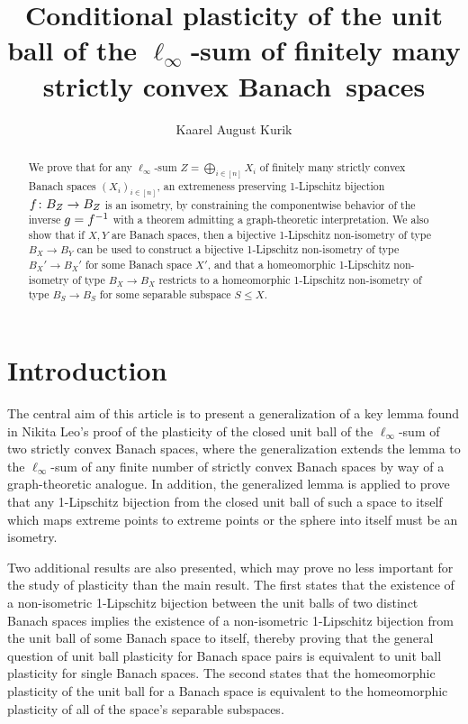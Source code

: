 \documentclass{amsart}
\title[Conditional plasticity]{Conditional plasticity of the unit ball of the \(\ell_\infty\)‑sum of finitely many strictly convex Banach~spaces}
\author{Kaarel August Kurik}
\date{}
\theoremstyle{definition}
\begin{document}
\begin{abstract}
    We prove that for any $\ell_\infty$-sum $Z = \bigoplus_{i \in [n]} X_i$ of finitely many strictly
    convex Banach spaces $(X_i)_{i \in [n]}$, an extremeness preserving 1-Lipschitz bijection
    $f\colon B_Z \to B_Z$ is an isometry, by constraining the componentwise behavior of the inverse
    $g=f^{-1}$ with a theorem admitting a graph-theoretic interpretation.
    We also show that if $X, Y$ are Banach spaces, then a bijective 1-Lipschitz non-isometry of
    type $B_X \to B_Y$ can be used to construct a bijective 1-Lipschitz non-isometry of type
    $B_X' \to B_X'$ for some Banach space $X'$, and that a homeomorphic 1-Lipschitz non-isometry of
    type $B_X \to B_X$ restricts to a homeomorphic 1-Lipschitz non-isometry of type
    $B_S \to B_S$ for some separable subspace $S \leq X$.
\end{abstract}

\maketitle

\section{Introduction}

The central aim of this article is to present a generalization of a key lemma
found in Nikita Leo's proof of the plasticity of the closed unit ball of
the $\ell_\infty$-sum of two strictly convex Banach spaces, where the generalization
extends the lemma to the $\ell_\infty$-sum of any finite number of strictly convex Banach
spaces by way of a graph-theoretic analogue. In addition, the generalized lemma is applied to prove that any 1-Lipschitz bijection from
the closed unit ball of such a space to itself
which maps extreme points to extreme points
or the sphere into itself must be an isometry.

Two additional results are also presented, which may prove no less important for the study of plasticity than the main result. The first states that the existence of a non-isometric 1-Lipschitz bijection between the unit balls of two distinct Banach spaces implies the existence of a non-isometric 1-Lipschitz bijection from the unit ball of some Banach space to itself, thereby proving that the general question of unit ball plasticity for Banach space pairs is equivalent to unit ball plasticity for single Banach spaces. The second states that the homeomorphic plasticity of the unit ball for a Banach space is equivalent to the homeomorphic plasticity of all of the space's separable subspaces.
\end{document}
